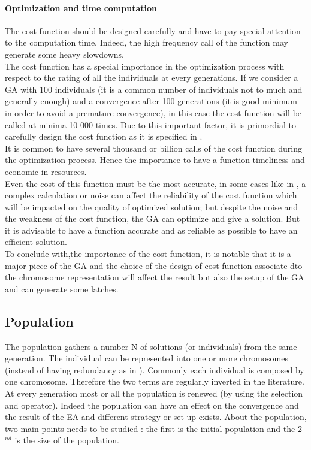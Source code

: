\paragraph*{Optimization and time computation}
The cost function should be designed carefully and have to pay special attention to the computation time. Indeed, the high frequency call of the function may generate some heavy slowdowns. \\
The cost function has a special importance in the optimization process with respect to  the rating of all the individuals at every generations. If we consider a GA with 100 individuals (it is a common number of individuals  not to much and  generally enough) and a convergence after 100 generations (it is good minimum in order to avoid a premature convergence), in this case the cost function will be called at minima 10 000 times. Due  to this important factor, it is primordial to carefully design the cost function as it is specified in \cite{70*arabas1994}.\\
It is common to have several thousand or billion calls of the cost function during the optimization process.
  Hence the importance to have a function timeliness and economic in resources. \\
Even the cost of this function must be the most accurate, in some cases like in \cite{95*miller1995}, a complex calculation or noise can affect the reliability of the cost function which will be impacted on the quality of optimized solution; but despite the noise and the weakness of the cost function, the GA can optimize and give a solution. But it is advisable to have a function accurate and as reliable as possible to have an efficient solution.\\
 To conclude with,the importance of the cost function, it is notable that it is a major piece of the GA and the choice of the design of cost function associate dto the chromosome representation will affect the result but also the setup of the GA and can generate some latches. \\

	
\subsection{Population }\label{sec:Population}
The population gathers a number N of solutions (or individuals) from the same generation. The individual can be represented into one or  more chromosomes (instead of having redundancy as in \cite{ 121*ronald1997}). Commonly each individual is composed by one chromosome. Therefore the two terms are regularly inverted in the literature.\\
At every generation most or all the population is renewed (by using the selection and operator). Indeed the population can have an effect on the convergence and the result of the EA and different strategy or set up exists. About the population, two main points needs to be studied : the first is the initial population and the 2$^{nd}$ is the size of the population.  


